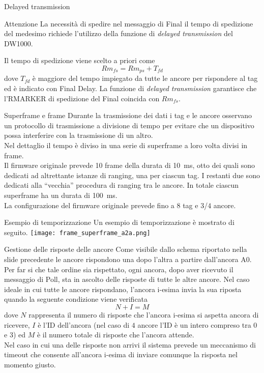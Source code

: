 \begin{frame}[label={delayed_tx}]{Delayed transmission}
  \begin{alertblock}{Attenzione}
    La necessità di spedire nel messaggio di Final il tempo di spedizione del medesimo richiede
    l'utilizzo della funzione di \emph{delayed transmission} del DW1000.
  \end{alertblock}
  Il tempo di spedizione viene scelto a priori come
  \[
  Rm_{fs} = Rm_{ps} + T_{fd}
  \]
  dove $T_{fd}$ è maggiore del tempo impiegato da \alert{tutte le ancore} per rispondere al tag ed è indicato
  con Final Delay.
  La funzione di \emph{delayed transmission} garantisce che l'RMARKER di spedizione del Final coincida con
  $Rm_{fs}$.
\end{frame}

\begin{frame}{Superframe e frame}
  Durante la trasmissione dei dati i tag e le ancore osservano un protocollo di trasmissione
  \alert{a divisione di tempo} per evitare che un dispositivo possa interferire con la trasmissione
  di un altro.\\
  Nel dettaglio il tempo è diviso in una serie di \alert{superframe} a loro volta divisi in
  frame.\\
  Il firmware originale prevede 10 frame della durata di \SI{10}{\milli\second}, otto dei quali
  sono dedicati ad altrettante istanze di ranging, una per ciascun tag. I restanti due sono dedicati
  alla ``vecchia'' procedura di ranging tra le ancore. In totale ciascun superframe ha un durata di \SI{100}{\milli\second}.\\
  La configurazione del firmware originale prevede fino a $8$ tag e $3$/$4$ ancore.
\end{frame}

\begin{frame}{Esempio di temporizzazione}
  Un esempio di temporizzazione è mostrato di seguito.
  \centering
  \texttt{[image: frame\_superframe\_a2a.png]}
\end{frame}

\begin{frame}[shrink=10, label={anchors_responses_turn}]{Gestione delle risposte delle ancore}
  Come visibile dallo schema riportato nella slide precedente le ancore rispondono una dopo l'altra \alert{a partire
  dall'ancora A0}.\\
  Per far si che tale ordine sia rispettato, ogni ancora, dopo aver ricevuto il messaggio di Poll, sta in ascolto
  delle risposte di tutte le altre ancore. Nel caso ideale in cui tutte le ancore rispondano, l'ancora i-esima
  invia la sua riposta quando la seguente condizione viene verificata
  \[
  N + I = M
  \]
  dove $N$ rappresenta il numero di risposte che l'ancora i-esima si aspetta ancora di ricevere,
  $I$ è l'ID dell'ancora (nel caso di $4$ ancore l'ID è un intero compreso tra $0$ e $3$) ed $M$
  è il numero totale di risposte che l'ancora attende.\\
  Nel caso in cui una delle risposte non arrivi il sistema prevede un \alert{meccanismo di timeout} che consente
  all'ancora i-esima di inviare comunque la risposta nel momento giusto.
\end{frame}

